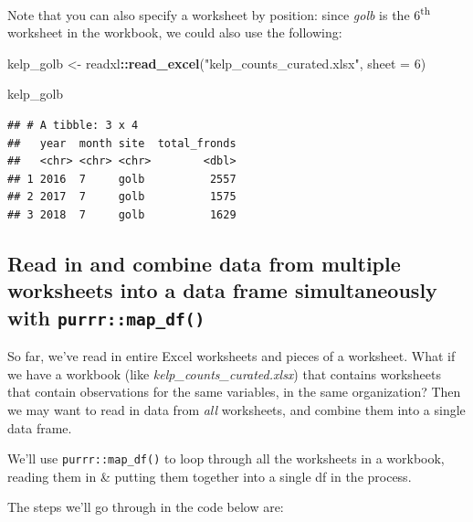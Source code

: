 \documentclass[]{book}
\newenvironment{Shaded}{\begin{snugshade}}{\end{snugshade}}
\newcommand{\DataTypeTok}[1]{\textcolor[rgb]{0.13,0.29,0.53}{#1}}
\newcommand{\DecValTok}[1]{\textcolor[rgb]{0.00,0.00,0.81}{#1}}
\newcommand{\KeywordTok}[1]{\textcolor[rgb]{0.13,0.29,0.53}{\textbf{#1}}}
\newcommand{\NormalTok}[1]{#1}
\newcommand{\OperatorTok}[1]{\textcolor[rgb]{0.81,0.36,0.00}{\textbf{#1}}}
\newcommand{\StringTok}[1]{\textcolor[rgb]{0.31,0.60,0.02}{#1}}
\begin{document}
Note that you can also specify a worksheet by position: since \emph{golb} is the 6\textsuperscript{th} worksheet in the workbook, we could also use the following:

\begin{Shaded}
\begin{Highlighting}[]
\NormalTok{kelp_golb <-}\StringTok{ }\NormalTok{readxl}\OperatorTok{::}\KeywordTok{read_excel}\NormalTok{(}\StringTok{"kelp_counts_curated.xlsx"}\NormalTok{, }\DataTypeTok{sheet =} \DecValTok{6}\NormalTok{)}
\end{Highlighting}
\end{Shaded}

\begin{Shaded}
\begin{Highlighting}[]
\NormalTok{kelp_golb}
\end{Highlighting}
\end{Shaded}

\begin{verbatim}
## # A tibble: 3 x 4
##   year  month site  total_fronds
##   <chr> <chr> <chr>        <dbl>
## 1 2016  7     golb          2557
## 2 2017  7     golb          1575
## 3 2018  7     golb          1629
\end{verbatim}

\hypertarget{read-in-and-combine-data-from-multiple-worksheets-into-a-data-frame-simultaneously-with-purrrmap_df}{%
\subsection{\texorpdfstring{Read in and combine data from multiple worksheets into a data frame simultaneously with \texttt{purrr::map\_df()}}{Read in and combine data from multiple worksheets into a data frame simultaneously with purrr::map\_df()}}\label{read-in-and-combine-data-from-multiple-worksheets-into-a-data-frame-simultaneously-with-purrrmap_df}}

So far, we've read in entire Excel worksheets and pieces of a worksheet. What if we have a workbook (like \emph{kelp\_counts\_curated.xlsx}) that contains worksheets that contain observations for the same variables, in the same organization? Then we may want to read in data from \emph{all} worksheets, and combine them into a single data frame.

We'll use \texttt{purrr::map\_df()} to loop through all the worksheets in a workbook, reading them in \& putting them together into a single df in the process.

The steps we'll go through in the code below are:
\end{document}
